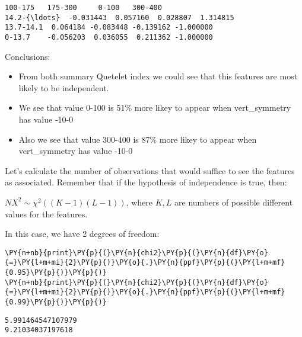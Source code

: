             \begin{tcolorbox}[breakable, size=fbox, boxrule=.5pt, pad at break*=1mm, opacityfill=0]
\begin{Verbatim}[commandchars=\\\{\}]
            100-175   175-300     0-100   300-400
14.2-{\ldots}  -0.031443  0.057160  0.028807  1.314815
13.7-14.1  0.064184 -0.083448 -0.139162 -1.000000
0-13.7    -0.056203  0.036055  0.211362 -1.000000
\end{Verbatim}
\end{tcolorbox}
        
    Conclusions:

\begin{itemize}
\item
  From both summary Quetelet index we could see that this features are
  most likely to be independent.
\item
  We see that value 0-100 is 51\% more likey to appear when
  vert\_symmetry has value -10-0
\item
  Also we see that value 300-400 is 87\% more likey to appear when
  vert\_symmetry has value -10-0
\end{itemize}

    Let's calculate the number of observations that would suffice to see the
features as associated. Remember that if the hypothesis of independence
is true, then:

\(NX^2 \sim \chi^2((K - 1)(L-1))\), where \(K, L\) are numbers of
possible different values for the features.

In this case, we have 2 degrees of freedom:

    \begin{tcolorbox}[breakable, size=fbox, boxrule=1pt, pad at break*=1mm,colback=cellbackground, colframe=cellborder]
\begin{Verbatim}[commandchars=\\\{\}]
\PY{n+nb}{print}\PY{p}{(}\PY{n}{chi2}\PY{p}{(}\PY{n}{df}\PY{o}{=}\PY{l+m+mi}{2}\PY{p}{)}\PY{o}{.}\PY{n}{ppf}\PY{p}{(}\PY{l+m+mf}{0.95}\PY{p}{)}\PY{p}{)}
\PY{n+nb}{print}\PY{p}{(}\PY{n}{chi2}\PY{p}{(}\PY{n}{df}\PY{o}{=}\PY{l+m+mi}{2}\PY{p}{)}\PY{o}{.}\PY{n}{ppf}\PY{p}{(}\PY{l+m+mf}{0.99}\PY{p}{)}\PY{p}{)}
\end{Verbatim}
\end{tcolorbox}

    \begin{Verbatim}[commandchars=\\\{\}]
5.991464547107979
9.21034037197618
    \end{Verbatim}

